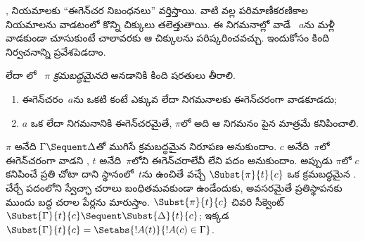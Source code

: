 \documentclass[../../../include/open-logic-section]{subfiles}
\begin{document}


\LeftR{\lexists}, \RightR{\lforall} నియమాలకు “ఈగెన్‌చర నిబంధనలు” వర్తిస్తాయి. వాటి వల్ల పరిమాణీకరణికాల నియమాలను వాడటంలో కొన్ని చిక్కులు తలెత్తుతాయి. ఈ నిగమనాల్లో వాడే ~$a$ను మళ్లీ వాడకుండా చూసుకుంటే చాలావరకు ఆ చిక్కులను పరిష్కరించవచ్చు. ఇందుకోసం కింది నిర్వచనాన్ని ప్రవేశపెడదాం.

\begin{defn}
 లేదా లో ~$\pi$ \emph{క్రమబద్ధమైనది} అనడానికి కింది షరతులు తీరాలి.
\begin{enumerate}
  \item ఈగెన్‌చరం~$a$ను ఒకటి కంటే ఎక్కువ \LeftR{\lexists} లేదా \RightR{\lforall} నిగమనాలకు ఈగెన్‌చరంగా వాడకూడదు;
  \item $a$ ఒక \LeftR{\lexists} లేదా \RightR{\lforall} నిగమనానికి ఈగెన్‌చరమైతే, $\pi$లో అది ఆ నిగమనం పైన మాత్రమే కనిపించాలి.
\end{enumerate}
\end{defn}

\begin{lem}
$\pi$ అనేది $\Gamma \Sequent \Delta$తో ముగిసే క్రమబద్ధమైన నిరూపణ అనుకుందాం. $c$ అనేది~$\pi$లో ఈగెన్‌చరంగా వాడని , $t$ అనేది~$\pi$లోని ఈగెన్‌చరాలేవీ లేని పదం అనుకుందాం. అప్పుడు $\pi$లో $c$ కనిపించే ప్రతి చోటా దాని స్థానంలో~$t$ను ఉంచితే వచ్చే $\Subst{\pi}{t}{c}$ ఒక క్రమబద్ధమైన . చేర్చే పదంలోని స్వేచ్ఛా చరాలు బంధితమవకుండా ఉండేందుకు, అవసరమైతే ప్రతిస్థాపనకు ముందు బద్ధ చరాల పేర్లను మారుస్తాం. $\Subst{\pi}{t}{c}$ చివరి సీక్వెంట్ $\Subst{\Gamma}{t}{c}
\Sequent \Subst{\Delta}{t}{c}$; ఇక్కడ $\Subst{\Gamma}{t}{c} =
\Setabs{!A(t)}{!A(c) \in \Gamma}$.
\end{lem}
\end{document}
